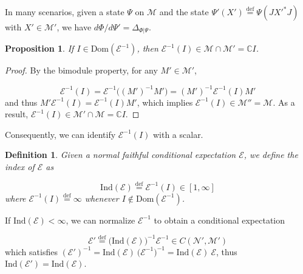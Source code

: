 \documentclass[a4paper,11pt]{article}
\newcommand{\eqdef}{\overset{\mathrm{def}}{=}}
\newtheorem{Definition}{Definition}[subsection]
\newtheorem{Proposition}{Proposition}[subsection]
\begin{document}
In many scenarios, given a state $\Psi$ on $\mathcal{M}$ and the state $\Psi' (X') \eqdef \Psi (J {X'}^* J)$ with $X' \in \mathcal{M}'$, we have $d\Phi/d\Psi' = \Delta_{\Phi|\Psi}$. 

\begin{Proposition}
    If $I \in \mathrm{Dom}(\mathcal{E}^{-1})$, then $\mathcal{E}^{-1}(I) \in \mathcal{M} \cap \mathcal{M}' = \mathbb{C} I$.
\end{Proposition}

\begin{proof}
    By the bimodule property, for any $M' \in \mathcal{M}'$,
    
    \begin{equation}
        \mathcal{E}^{-1}(I) = \mathcal{E}^{-1} \big( (M')^{-1} M' \big) = (M')^{-1} \mathcal{E}^{-1} (I) M'
    \end{equation}
    and thus $M' \mathcal{E}^{-1}(I) = \mathcal{E}^{-1}(I) M'$, which implies $\mathcal{E}^{-1}(I) \in \mathcal{M}'' = \mathcal{M}$. As a result, $\mathcal{E}^{-1}(I) \in \mathcal{M}' \cap \mathcal{M} =  \mathbb{C} I$.
\end{proof}

Consequently, we can identify $\mathcal{E}^{-1}(I)$ with a scalar.

\begin{Definition}
    Given a normal faithful conditional expectation $\mathcal{E}$, we define the \textnormal{index} of $\mathcal{E}$ as

    \begin{equation}
        \mathrm{Ind}(\mathcal{E}) \eqdef \mathcal{E}^{-1}(I) \in [1, \infty]
    \end{equation}
    where $\mathcal{E}^{-1}(I) \eqdef \infty$ whenever $I \not\in \mathrm{Dom}(\mathcal{E}^{-1})$.
\end{Definition}

If $\mathrm{Ind}(\mathcal{E}) < \infty$, we can normalize $\mathcal{E}^{-1}$ to obtain a conditional expectation

\begin{equation}
    \mathcal{E}' \eqdef \big( \mathrm{Ind}(\mathcal{E}) \big)^{-1} \mathcal{E}^{-1} \in C(\mathcal{N}', \mathcal{M}')
\end{equation}
%
which satisfies $(\mathcal{E}')^{-1} = \mathrm{Ind}(\mathcal{E}) \ \big( \mathcal{E}^{-1} \big)^{-1} = \mathrm{Ind}(\mathcal{E}) \ \mathcal{E}$, thus $\mathrm{Ind}(\mathcal{E}') = \mathrm{Ind}(\mathcal{E})$.
\end{document}
